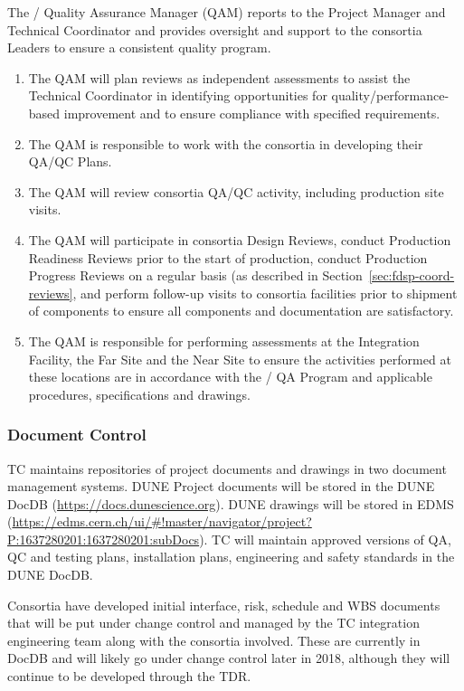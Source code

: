 The / Quality Assurance Manager (QAM) reports
to the  Project Manager and  Technical
Coordinator and provides oversight and support to the consortia
Leaders to ensure a consistent quality program.
\begin{enumerate}
  \item The QAM will plan reviews as independent assessments to assist
    the  Technical Coordinator in identifying opportunities for
    quality/performance-based improvement and to ensure compliance
    with specified requirements.
  \item The QAM is responsible to work with the consortia in
    developing their QA/QC Plans.
  \item The QAM will review consortia QA/QC activity, including
    production site visits.
  \item The QAM will participate in consortia Design Reviews, conduct
    Production Readiness Reviews prior to the start of production,
    conduct Production Progress Reviews on a regular basis (as
    described in Section~\ref{sec:fdsp-coord-reviews}, and perform
    follow-up visits to consortia facilities prior to shipment of
    components to ensure all components and documentation are
    satisfactory.
\item The QAM is responsible for performing assessments at the
  Integration Facility, the Far Site and the Near Site to
  ensure the activities performed at these locations are in accordance
  with the / QA Program and applicable procedures,
  specifications and drawings.
\end{enumerate}

\subsubsection{Document Control}
\label{sec:fdsp-coord-document}

TC maintains repositories of project documents and drawings in two
document management systems.  DUNE Project documents will be stored in
the DUNE DocDB (\url{https://docs.dunescience.org}). DUNE drawings
will be stored in EDMS
(\url{https://edms.cern.ch/ui/#!master/navigator/project?P:1637280201:1637280201:subDocs}).
TC will maintain approved versions of QA, QC and testing plans,
installation plans, engineering and safety standards in the DUNE
DocDB.

Consortia have developed initial interface, risk, schedule and WBS
documents that will be put under change control and managed by the TC
integration engineering team along with the consortia involved. These
are currently in DocDB and will likely go under change control later
in 2018, although they will continue to be developed through the TDR.

